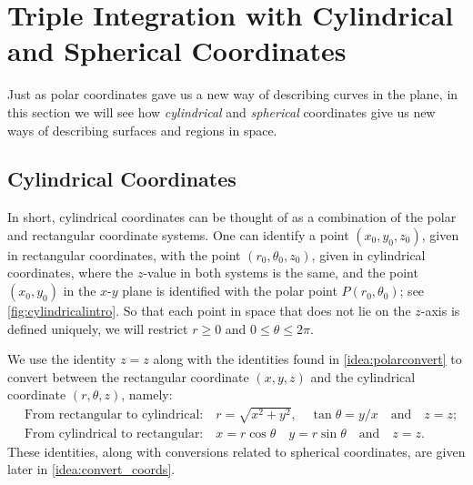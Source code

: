 \section{Triple Integration with Cylindrical and Spherical Coordinates}\label{sec:cylindrical_spherical}

Just as polar coordinates gave us a new way of describing curves in the plane, in this section we will see how \emph{cylindrical} and \emph{spherical} coordinates give us new ways of describing surfaces and regions in space.


\subsection{Cylindrical Coordinates}

In short, cylindrical coordinates can be thought of as a combination of the polar and rectangular coordinate systems. %
One can identify a point $(x_0,y_0,z_0)$, given in rectangular coordinates, with the point $(r_0,\theta_0,z_0)$, given in cylindrical coordinates, where the $z$-value in both systems is the same, and the point $(x_0,y_0)$ in the $x$-$y$ plane is identified with the polar point $P(r_0,\theta_0)$; see \autoref{fig:cylindricalintro}. So that each point in space that does not lie on the $z$-axis is defined uniquely, we will restrict $r\geq 0$ and $0\leq \theta\leq 2\pi$.

We use the identity $z=z$ along with the identities found in \autoref{idea:polarconvert} to convert between the  rectangular coordinate $(x,y,z)$ and the  cylindrical coordinate $(r,\theta,z)$, namely:
%
%
\begin{align*}
&\text{From rectangular to cylindrical:}\quad r=\sqrt{x^2+y^2},\quad \tan\theta = y/x \quad\text{and}\quad z=z;\\
&\text{From cylindrical to rectangular:} \quad x=r\cos\theta\quad y=r\sin\theta\quad \text{and}\quad z=z.
\end{align*}
These identities, along with conversions related to spherical coordinates, are given later in \autoref{idea:convert_coords}.

